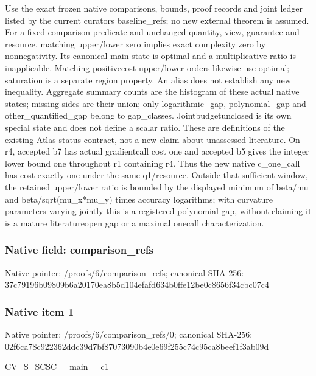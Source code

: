 \documentclass[10pt,a4paper]{article}
\begin{document}
Use the exact frozen native comparisons, bounds, proof records and joint ledger listed by the current curators baseline\_refs; no new external theorem is assumed. For a fixed comparison predicate and unchanged quantity, view, guarantee and resource, matching upper/lower zero implies exact complexity zero by nonnegativity. Its canonical main state is optimal and a multiplicative ratio is inapplicable. Matching positivecost upper/lower orders likewise use optimal; saturation is a separate region property. An alias does not establish any new inequality. Aggregate summary counts are the histogram of these actual native states; missing sides are their union; only logarithmic\_gap, polynomial\_gap and other\_quantified\_gap belong to gap\_classes. Jointbudgetunclosed is its own special state and does not define a scalar ratio. These are definitions of the existing Atlas status contract, not a new claim about unassessed literature. On r4, accepted b7 has actual gradientcall cost one and accepted b5 gives the integer lower bound one throughout r1 containing r4. Thus the new native c\_one\_call has cost exactly one under the same q1/resource. Outside that sufficient window, the retained upper/lower ratio is bounded by the displayed minimum of beta/mu and beta/sqrt(mu\_x*mu\_y) times accuracy logarithms; with curvature parameters varying jointly this is a registered polynomial gap, without claiming it is a mature literatureopen gap or a maximal onecall characterization.


\subsubsection{Native field: comparison\_refs}


Native pointer: /proofs/6/comparison\_refs; canonical SHA-256: 37c79196b09809b6a20170ea\allowbreak{}8b5d104efafd634b0ffe12be\allowbreak{}0c8656f34cbc07c4



\subsubsection{Native item 1}


Native pointer: /proofs/6/comparison\_refs/0; canonical SHA-256: 02f6ca78c922362ddc39d7bf\allowbreak{}87073090b4e0e69f255c74c9\allowbreak{}5ca8beef1f3ab09d


CV\_S\_SCSC\_\_main\_\_c1
\end{document}
